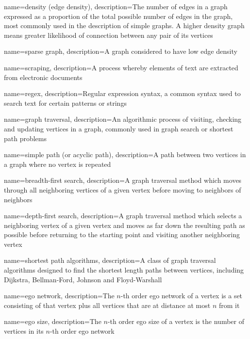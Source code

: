 {
    name={density (edge density)},
    description={The number of edges in a graph expressed as a proportion of the total possible number of edges in the graph, most commonly used in the description of simple graphs.  A higher density graph means greater likelihood of connection between any pair of its vertices}
}

{
    name={sparse graph},
    description={A graph considered to have low edge density}
}

{
    name={scraping},
    description={A process whereby elements of text are extracted from electronic documents}
}

{
    name={regex},
    description={Regular expression syntax, a common syntax used to search text for certain patterns or strings}
}

{
    name={graph traversal},
    description={An algorithmic process of visiting, checking and updating vertices in a graph, commonly used in graph search or shortest path problems}
}

{
    name={simple path (or acyclic path)},
    description={A path between two vertices in a graph where no vertex is repeated}
}

{
    name={breadth-first search},
    description={A graph traversal method which moves through all neighboring vertices of a given vertex before moving to neighbors of neighbors}
}

{
    name={depth-first search},
    description={A graph traversal method which selects a neighboring vertex of a given vertex and moves as far down the resulting path as possible before returning to the starting point and visiting another neighboring vertex}
}

{
    name={shortest path algorithms},
    description={A class of graph traversal algorithms designed to find the shortest length paths between vertices, including Dijkstra, Bellman-Ford, Johnson and Floyd-Warshall}
}

{
    name={ego network},
    description={The $n$-th order ego network of a vertex is a set consisting of that vertex plus all vertices that are at distance at most $n$ from it}
}

{
    name={ego size},
    description={The $n$-th order ego size of a vertex is the number of vertices in its $n$-th order ego network}
}

